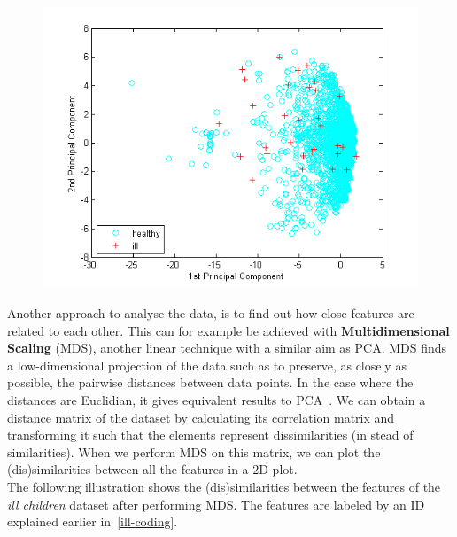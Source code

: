 \begin{figure}[h]
\includegraphics[scale=0.95]{img/pca_space.png}
\end{figure}


Another approach to analyse the data, is to find out how close features are related to each other. This can for example be achieved with \textbf{Multidimensional Scaling} (MDS), another linear technique with a similar aim as PCA.  MDS finds a low-dimensional projection of the data such as to preserve, as closely as possible, the pairwise distances between data points.  In the case where the distances are Euclidian, it gives equivalent results to PCA~\cite{bishop}.
We can obtain a distance matrix of the dataset by calculating its correlation matrix and transforming it such that the elements represent dissimilarities (in stead of similarities). When we perform MDS on this matrix, we can plot the (dis)similarities between all the features in a 2D-plot.\\
The following illustration shows the (dis)similarities between the features of the \textit{ill children} dataset after performing MDS. The features are labeled by an ID explained earlier in~\ref{ill-coding}.


\newpage

